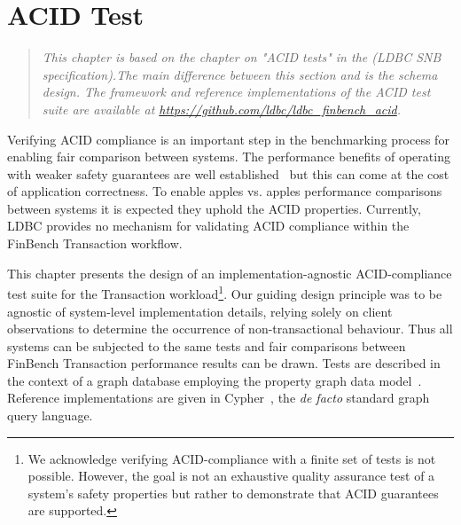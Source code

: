 \chapter{ACID Test}
\label{sec:acid-test}

\newcommand{\bl}[1]{\textcolor{blue}{#1}}
\newcommand{\rd}[1]{\textcolor{red}{#1}}
\newcommand{\gn}[1]{\textcolor{green}{#1}}
\newcommand{\gy}[1]{\textcolor{grey}{\textit{#1}}}

\newcommand{\level}[1]{\textsf{#1}}
\newcommand{\anomaly}[1]{\rd{#1}}
\newcommand{\anolong}[1]{\emph{\rd{#1}}}
\newcommand{\tx}[1]{#1}

\newcommand{\cmark}{\ding{51}}
\newcommand{\xmark}{\ding{55}}


\begin{quote}
  \textit{This chapter is based on the chapter on "ACID tests" in the 
          \ldbcsnb(LDBC SNB specification).The main difference between
          this section and \ldbcsnb\xspace is the schema design. The
          framework and reference implementations of the ACID test suite
          are available at \url{https://github.com/ldbc/ldbc_finbench_acid}.
  }
\end{quote}

Verifying ACID compliance is an important step in the benchmarking process for 
enabling fair comparison between systems. The performance benefits of operating
with weaker safety guarantees are well established~\cite{DBLP:conf/ds/GrayLPT76}
but this can come at the cost of application correctness. To enable apples vs. 
apples performance comparisons between systems it is expected they uphold the 
ACID properties. Currently, LDBC provides no mechanism for validating ACID 
compliance within the FinBench Transaction workflow.

This chapter presents the design of an implementation-agnostic ACID-compliance
test suite for the Transaction workload\footnote{We acknowledge verifying 
ACID-compliance with a finite set of tests is not possible. However, the goal is
not an exhaustive quality assurance test of a system's safety properties but 
rather to demonstrate that ACID guarantees are supported.}. Our guiding design
principle was to be agnostic of system-level implementation details, relying 
solely on client observations to determine the occurrence of non-transactional 
behaviour. Thus all systems can be subjected to the same tests and fair 
comparisons between FinBench Transaction performance results can be drawn. Tests
are described in the context of a graph database employing the property graph data 
model~\cite{DBLP:journals/csur/AnglesABHRV17}. Reference implementations are 
given in Cypher~\cite{DBLP:conf/sigmod/FrancisGGLLMPRS18}, the \emph{de facto} 
standard graph query language.


